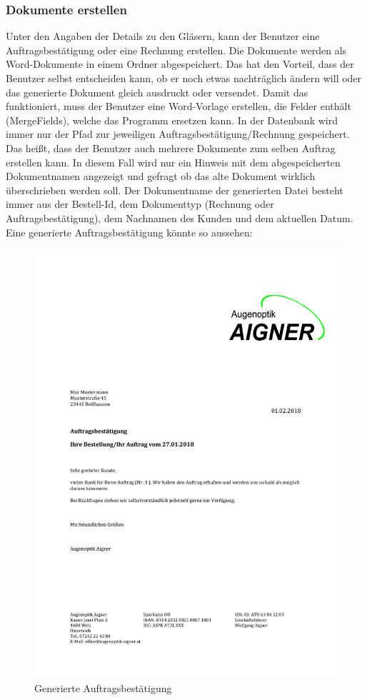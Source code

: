 \subsubsection{Dokumente erstellen}
Unter den Angaben der Details zu den Gläsern, kann der Benutzer eine Auftragsbestätigung oder eine Rechnung erstellen. Die Dokumente werden als Word-Dokumente in einem Ordner abgespeichert. Das hat den Vorteil, dass der Benutzer selbst entscheiden kann, ob er noch etwas nachträglich ändern will oder das generierte Dokument gleich ausdruckt oder versendet. Damit das funktioniert, muss der Benutzer  eine Word-Vorlage erstellen, die Felder enthält (MergeFields), welche das Programm ersetzen kann. In der Datenbank wird immer nur der Pfad zur jeweiligen Auftragsbestätigung/Rechnung gespeichert. Das heißt, dass der Benutzer auch mehrere Dokumente zum selben Auftrag erstellen kann. In diesem Fall wird nur ein Hinweis mit dem abgespeicherten Dokumentnamen angezeigt und gefragt ob das alte Dokument wirklich überschrieben werden soll. Der Dokumentname der generierten Datei besteht immer aus der Bestell-Id, dem Dokumenttyp (Rechnung oder Auftragsbestätigung), dem Nachnamen des Kunden und dem aktuellen Datum. 
\newline Eine generierte Auftragsbestätigung könnte so aussehen:
\begin{figure}[H]
\begin{center}
	\includegraphics[scale=.75]{images/MusterAuftragsbestaetigung.pdf}
\end{center}
	\caption{Generierte Auftragsbest\"atigung}
	\label{fig:sample}
\end{figure}
